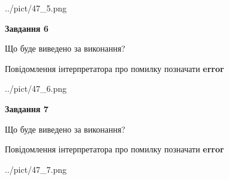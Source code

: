 \documentclass[10pt, ukrainian]{article}
\begin{document}
{\begin {large}
\begin{center}
	{../pict/47_5.png}
\end{center}
\newpage

{\begin {center}\textbf{Завдання 6}\end {center}}\par
Що буде виведено за виконання? \par
Повідомлення інтерпретатора про помилку позначати \textbf{error}

\begin{center}
	{../pict/47_6.png}
\end{center}
\newpage

{\begin {center}\textbf{Завдання 7}\end {center}}\par
Що буде виведено за виконання? \par
Повідомлення інтерпретатора про помилку позначати \textbf{error}

\begin{center}
	{../pict/47_7.png}
\end{center}
\newpage

\end {large}}
\end{document}
